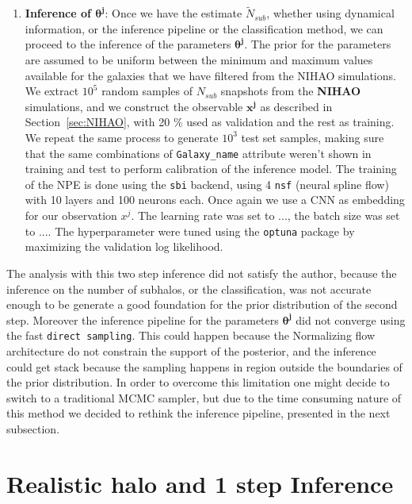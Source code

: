 \begin{enumerate}
    \item \textbf{Inference of $\mathbf{\theta^j}$}: Once we have the estimate $\tilde{N}_{sub}$, whether using dynamical information, or the inference pipeline or the classification method, we can proceed to the inference of the parameters $\mathbf{\theta^j}$. The prior for the parameters are assumed to be uniform between the minimum and maximum values available for the galaxies that we have filtered from the NIHAO simulations. We extract $10^5$ random samples of $N_{sub}$ snapshots from the \textbf{NIHAO} simulations, and we construct the observable \textbf{$\mathbf{x^j}$} as described in Section~\ref{sec:NIHAO}, with 20 \% used as validation and the rest as training. We repeat the same process to generate $10^3$ test set samples, making sure that the same combinations of \texttt{Galaxy\_name} attribute weren't shown in training and test to perform calibration of the inference model. The training of the NPE is done using the \texttt{sbi} backend, using 4 \texttt{nsf} (neural spline flow) with 10 layers and 100 neurons each. Once again we use a CNN as embedding for our observation $x^j$. The learning rate was set to ..., the batch size was set to .... The hyperparameter were tuned using the \texttt{optuna} package by maximizing the validation log likelihood.  
\end{enumerate}

The analysis with this two step inference did not satisfy the author, because the inference on the number of subhalos, or the classification, was not accurate enough to be generate a good foundation for the prior distribution of the second step. Moreover the inference pipeline for the parameters $\mathbf{\theta^j}$ did not converge using the fast \texttt{direct sampling}. This could happen because the Normalizing flow architecture do not constrain the support of the posterior, and the inference could get stack because the sampling happens in region outside the boundaries of the prior distribution. In order to overcome this limitation one might decide to switch to a traditional MCMC sampler, but due to the time consuming nature of this method we decided to rethink the inference pipeline, presented in the next subsection.    

\section{Realistic halo and 1 step Inference}

